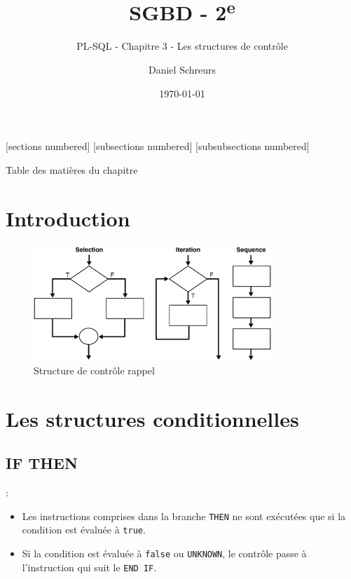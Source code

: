 \documentclass[10pt]{beamer}
\title{SGBD - 2\textsuperscript{e}}
\subtitle{PL-SQL - Chapitre 3 - Les structures de contrôle}
\date{\today}
\author{Daniel Schreurs}
\institute{Haute École de la Province de Liège}
\begin{document}
\maketitle

[sections numbered]
[subsections numbered]
[subsubsections numbered]
\begin{frame}[allowframebreaks]{Table des matières du chapitre}
    \tableofcontents[subsectionstyle=show/show/hide,subsubsectionstyle=show/show/hide,]
\end{frame}

\section{Introduction}
\tocss
\begin{frame}{\secname}
    \begin{figure}
        \begin{center}
            \includegraphics[width=0.8\textwidth]{../assets/img/structure-controle-rappel.png}
            \caption{Structure de contrôle rappel}
        \end{center}
    \end{figure}
\end{frame}

\section{Les structures conditionnelles}
\tocss
\subsection{IF THEN}
\begin{frame}{\secname : \subsecname}
    \begin{itemize}
        \item   Les instructions comprises dans la branche \lstinline[language=plsql]!THEN! ne sont exécutées que si la condition est évaluée à \lstinline[language=plsql]!true!.
        \item Si la condition est évaluée à \lstinline[language=plsql]!false! ou \lstinline[language=plsql]!UNKNOWN!, le contrôle passe à l'instruction qui suit le \lstinline[language=plsql]!END IF!.
    \end{itemize}
\end{frame}
\end{document}
